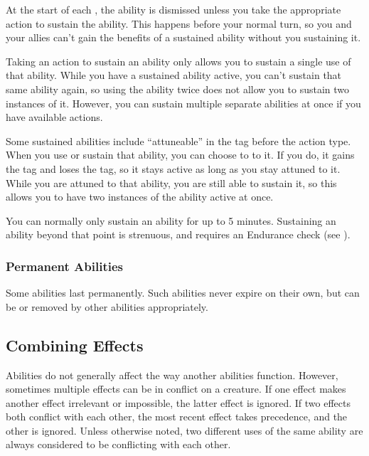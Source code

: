       At the start of each , the ability is dismissed unless you take the appropriate action to sustain the ability.
      This happens before your normal turn, so you and your allies can't gain the benefits of a sustained ability without you sustaining it.

      Taking an action to sustain an ability only allows you to sustain a single use of that ability.
      While you have a sustained ability active, you can't sustain that same ability again, so using the ability twice does not allow you to sustain two instances of it.
      However, you can sustain multiple separate abilities at once if you have available actions.

      Some sustained abilities include ``attuneable'' in the tag before the action type.
      When you use or sustain that ability, you can choose to  to it.
      If you do, it gains the  tag and loses the  tag, so it stays active as long as you stay attuned to it.
      While you are attuned to that ability, you are still able to sustain it, so this allows you to have two instances of the ability active at once.

      You can normally only sustain an ability for up to 5 minutes.
      Sustaining an ability beyond that point is strenuous, and requires an Endurance check (see ).

    \subsubsection{Permanent Abilities}
      Some abilities last permanently.
      Such abilities never expire on their own, but can be  or removed by other abilities appropriately.

  \subsection{Combining Effects}
    Abilities do not generally affect the way another abilities function.
    However, sometimes multiple effects can be in conflict on a creature.
    If one effect makes another effect irrelevant or impossible, the latter effect is ignored.
    If two effects both conflict with each other, the most recent effect takes precedence, and the other is ignored.
    Unless otherwise noted, two different uses of the same ability are always considered to be conflicting with each other.

